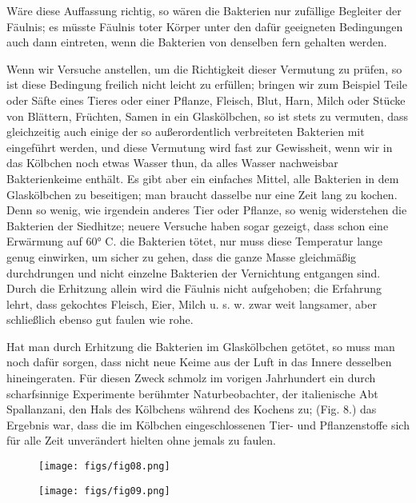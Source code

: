 \documentclass[a4paper, 11pt, oneside, english]{article}
\begin{document}
Wäre diese Auffassung richtig, so wären die Bakterien nur zufällige Begleiter der Fäulnis; es müsste Fäulnis toter Körper unter den dafür geeigneten Bedingungen auch dann eintreten, wenn die Bakterien von denselben fern gehalten werden.

Wenn wir Versuche anstellen, um die Richtigkeit dieser Vermutung zu prüfen, so ist diese Bedingung freilich nicht leicht zu erfüllen; bringen wir zum Beispiel Teile oder Säfte eines Tieres oder einer Pflanze, Fleisch, Blut, Harn, Milch oder Stücke von Blättern, Früchten, Samen in ein Glaskölbchen, so ist stets zu vermuten, dass gleichzeitig auch einige der so außerordentlich verbreiteten Bakterien mit eingeführt werden, und diese Vermutung wird fast zur Gewissheit, wenn wir in das Kölbchen noch etwas Wasser thun, da alles Wasser nachweisbar Bakterienkeime enthält. Es gibt aber ein einfaches Mittel, alle Bakterien in dem Glaskölbchen zu beseitigen; man braucht dasselbe nur eine Zeit lang zu kochen. Denn so wenig, wie irgendein anderes Tier oder Pflanze, so wenig widerstehen die Bakterien der Siedhitze; neuere Versuche haben sogar gezeigt, dass schon eine Erwärmung auf 60° C. die Bakterien tötet, nur muss diese Temperatur lange genug einwirken, um sicher zu gehen, dass die ganze Masse gleichmäßig durchdrungen und nicht einzelne Bakterien der Vernichtung entgangen sind. Durch die Erhitzung allein wird die Fäulnis nicht aufgehoben; die Erfahrung lehrt, dass gekochtes Fleisch, Eier, Milch u. s. w. zwar weit langsamer, aber schließlich ebenso gut faulen wie rohe.

Hat man durch Erhitzung die Bakterien im Glaskölbchen getötet, so muss man noch dafür sorgen, dass nicht neue Keime aus der Luft in das Innere desselben hineingeraten. Für diesen Zweck schmolz im vorigen Jahrhundert ein durch scharfsinnige Experimente berühmter Naturbeobachter, der italienische Abt Spallanzani, den Hals des Kölbchens während des Kochens zu; (Fig. 8.) das Ergebnis war, dass die im Kölbchen eingeschlossenen Tier- und Pflanzenstoffe sich für alle Zeit unverändert hielten ohne jemals zu faulen.

\begin{figure}[H]
\centering
\texttt{[image: figs/fig08.png]}
\caption{}
\end{figure}

\begin{figure}[H]
\centering
\texttt{[image: figs/fig09.png]}
\caption{}
\end{figure}
\end{document}

